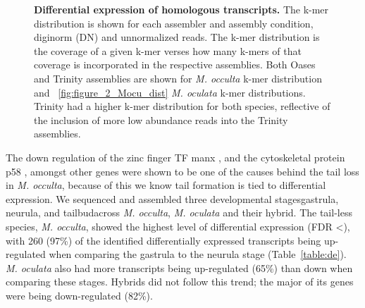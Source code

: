 \begin{figure}
{	}
	\caption{\textbf{Differential expression of homologous transcripts.} The k-mer distribution is shown for each assembler and assembly condition, diginorm (DN) and unnormalized reads. The k-mer distribution is the coverage of a given k-mer verses how many k-mers of that coverage is incorporated in the respective assemblies. Both Oases and Trinity assemblies are shown for \textit{M. occulta} k-mer distribution and  ~\ref{fig:figure_2_Mocu_dist} \textit{M. oculata} k-mer distributions. Trinity had a higher k-mer distribution for both species, reflective of the inclusion of more low abundance reads into the Trinity assemblies.}
	\label{fig:de_plots}
\end{figure}

The down regulation of the zinc finger TF manx \cite{swalla_requirement_1996}, and the cytoskeletal protein p58 \cite{swalla_identification_1991}, amongst other genes were shown to be one of the causes behind the tail loss in \textit{M. occulta}, because of this we know tail formation is tied to differential expression. We sequenced and assembled three developmental stages\textemdash gastrula, neurula, and tailbud\textemdash across \textit{M. occulta}, \textit{M. oculata} and their hybrid. The tail-less species, \textit{M. occulta}, showed the highest level of differential expression (FDR \textless), with 260 (97\%) of the identified differentially expressed transcripts being up-regulated when comparing the gastrula to the neurula stage (Table~\ref{table:de}). \textit{M. oculata} also had more transcripts being up-regulated (65\%) than down when comparing these stages. Hybrids did not follow this trend; the major of its genes were being down-regulated (82\%).  

